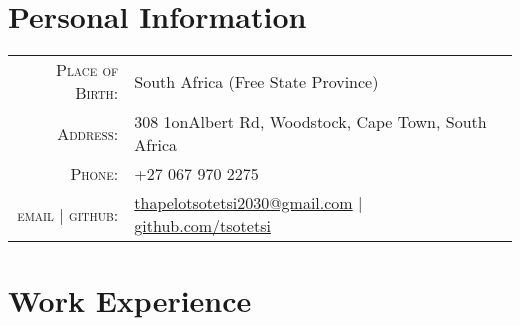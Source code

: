 \documentclass[a4paper,10pt]{article} %
\begin{document}
\pagestyle{empty} %


\par{\bigskip\par} %

\section{Personal Information}

\begin{tabular}{rl}
\textsc{Place of Birth:} & South Africa (Free State Province)\\
\textsc{Address:} & 308 1onAlbert Rd, Woodstock, Cape Town, South Africa \\
\textsc{Phone:} & +27 067 970 2275\\
\textsc{email | github:} & \href{mailto:thapelotsotetsi2030@gmail.com}{thapelotsotetsi2030@gmail.com} | \href{https:github.com/tsotetsi}{github.com/tsotetsi}
\end{tabular}

\section{Work Experience}
\end{document}
